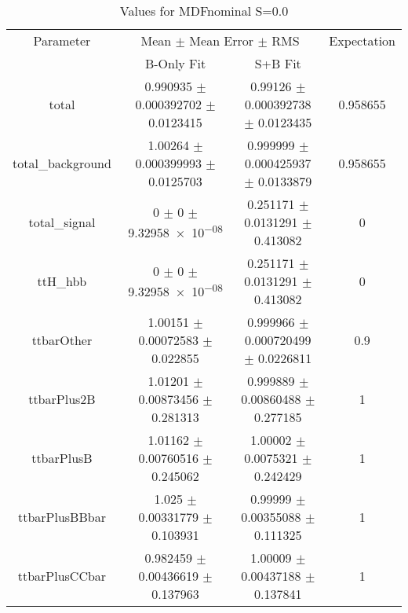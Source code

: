 \begin{table}
\centering
\caption{Values for MDFnominal S=0.0}
\begin{tabular}{cccc}
\toprule
Parameter & \multicolumn{2}{c}{Mean $\pm$ Mean Error $\pm$ RMS} & Expectation\\
 & B-Only Fit & S+B Fit & \\
\midrule
total & \num{0.990935} $\pm$ \num{0.000392702} $\pm$ \num{0.0123415} & \num{0.99126} $\pm$ \num{0.000392738} $\pm$ \num{0.0123435} & \num{0.958655}\\
total\_background & \num{1.00264} $\pm$ \num{0.000399993} $\pm$ \num{0.0125703} & \num{0.999999} $\pm$ \num{0.000425937} $\pm$ \num{0.0133879} & \num{0.958655}\\
total\_signal & \num{0} $\pm$ \num{0} $\pm$ \num{9.32958e-08} & \num{0.251171} $\pm$ \num{0.0131291} $\pm$ \num{0.413082} & \num{0}\\
ttH\_hbb & \num{0} $\pm$ \num{0} $\pm$ \num{9.32958e-08} & \num{0.251171} $\pm$ \num{0.0131291} $\pm$ \num{0.413082} & \num{0}\\
ttbarOther & \num{1.00151} $\pm$ \num{0.00072583} $\pm$ \num{0.022855} & \num{0.999966} $\pm$ \num{0.000720499} $\pm$ \num{0.0226811} & \num{0.9}\\
ttbarPlus2B & \num{1.01201} $\pm$ \num{0.00873456} $\pm$ \num{0.281313} & \num{0.999889} $\pm$ \num{0.00860488} $\pm$ \num{0.277185} & \num{1}\\
ttbarPlusB & \num{1.01162} $\pm$ \num{0.00760516} $\pm$ \num{0.245062} & \num{1.00002} $\pm$ \num{0.0075321} $\pm$ \num{0.242429} & \num{1}\\
ttbarPlusBBbar & \num{1.025} $\pm$ \num{0.00331779} $\pm$ \num{0.103931} & \num{0.99999} $\pm$ \num{0.00355088} $\pm$ \num{0.111325} & \num{1}\\
ttbarPlusCCbar & \num{0.982459} $\pm$ \num{0.00436619} $\pm$ \num{0.137963} & \num{1.00009} $\pm$ \num{0.00437188} $\pm$ \num{0.137841} & \num{1}\\
\bottomrule
\end{tabular}
\end{table}